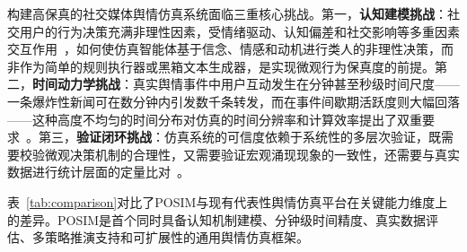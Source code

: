 \documentclass[lettersize,journal]{IEEEtran}
\begin{document}
构建高保真的社交媒体舆情仿真系统面临三重核心挑战。第一，\textbf{认知建模挑战}：社交用户的行为决策充满非理性因素，受情绪驱动、认知偏差和社交影响等多重因素交互作用~\cite{kramer_experimental_2014}，如何使仿真智能体基于信念、情感和动机进行类人的非理性决策，而非作为简单的规则执行器或黑箱文本生成器，是实现微观行为保真度的前提。第二，\textbf{时间动力学挑战}：真实舆情事件中用户互动发生在分钟甚至秒级时间尺度——一条爆炸性新闻可在数分钟内引发数千条转发，而在事件间歇期活跃度则大幅回落——这种高度不均匀的时间分布对仿真的时间分辨率和计算效率提出了双重要求~\cite{zhao_seismic_2015}。第三，\textbf{验证闭环挑战}：仿真系统的可信度依赖于系统性的多层次验证，既需要校验微观决策机制的合理性，又需要验证宏观涌现现象的一致性，还需要与真实数据进行统计层面的定量比对~\cite{mcculloch_calibrating_2022}。

表~\ref{tab:comparison}对比了POSIM与现有代表性舆情仿真平台在关键能力维度上的差异。POSIM是首个同时具备认知机制建模、分钟级时间精度、真实数据评估、多策略推演支持和可扩展性的通用舆情仿真框架。
\end{document}
